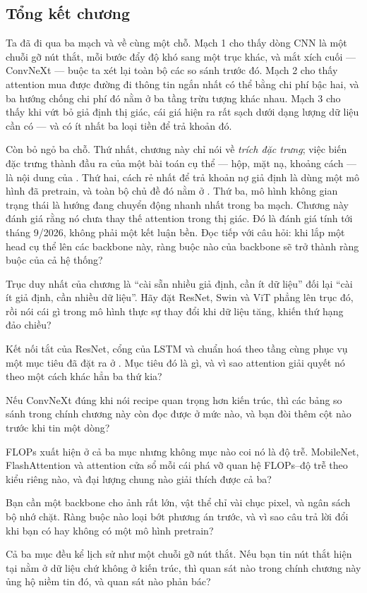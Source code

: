 \documentclass[../../deep_learning.tex]{subfiles}
\begin{document}
\subsection*{Tổng kết chương}
Ta đã đi qua ba mạch và về cùng một chỗ. Mạch 1 cho thấy dòng CNN là một chuỗi gỡ nút thắt, mỗi bước đẩy độ khó sang một trục khác, và mắt xích cuối --- ConvNeXt --- buộc ta xét lại toàn bộ các so sánh trước đó. Mạch 2 cho thấy attention mua được đường đi thông tin ngắn nhất có thể bằng chi phí bậc hai, và ba hướng chống chi phí đó nằm ở ba tầng trừu tượng khác nhau. Mạch 3 cho thấy khi vứt bỏ giả định thị giác, cái giá hiện ra rất sạch dưới dạng lượng dữ liệu cần có --- và có ít nhất ba loại tiền để trả khoản đó.

Còn bỏ ngỏ ba chỗ. Thứ nhất, chương này chỉ nói về \emph{trích đặc trưng}; việc biến đặc trưng thành đầu ra của một bài toán cụ thể --- hộp, mặt nạ, khoảng cách --- là nội dung của . Thứ hai, cách rẻ nhất để trả khoản nợ giả định là dùng một mô hình đã pretrain, và toàn bộ chủ đề đó nằm ở . Thứ ba, mô hình không gian trạng thái là hướng đang chuyển động nhanh nhất trong ba mạch. Chương này đánh giá rằng nó chưa thay thế attention trong thị giác. Đó là đánh giá tính tới tháng 9/2026, không phải một kết luận bền. Đọc tiếp  với câu hỏi: khi lắp một head cụ thể lên các backbone này, ràng buộc nào của backbone sẽ trở thành ràng buộc của cả hệ thống?
\begin{tukiem}
\item Trục duy nhất của chương là ``cài sẵn nhiều giả định, cần ít dữ liệu'' đối lại ``cài ít giả định, cần nhiều dữ liệu''. Hãy đặt ResNet, Swin và ViT phẳng lên trục đó, rồi nói cái gì trong mô hình thực sự thay đổi khi dữ liệu tăng, khiến thứ hạng đảo chiều?
\item Kết nối tắt của ResNet, cổng của LSTM và chuẩn hoá theo tầng cùng phục vụ một mục tiêu đã đặt ra ở . Mục tiêu đó là gì, và vì sao attention giải quyết nó theo một cách khác hẳn ba thứ kia?
\item Nếu ConvNeXt đúng khi nói recipe quan trọng hơn kiến trúc, thì các bảng so sánh trong chính chương này còn đọc được ở mức nào, và bạn đòi thêm cột nào trước khi tin một dòng?
\item FLOPs xuất hiện ở cả ba mục nhưng không mục nào coi nó là độ trễ. MobileNet, FlashAttention và attention cửa sổ mỗi cái phá vỡ quan hệ FLOPs--độ trễ theo kiểu riêng nào, và đại lượng chung nào giải thích được cả ba?
\item Bạn cần một backbone cho ảnh rất lớn, vật thể chỉ vài chục pixel, và ngân sách bộ nhớ chặt. Ràng buộc nào loại bớt phương án trước, và vì sao câu trả lời đổi khi bạn có hay không có một mô hình pretrain?
\item Cả ba mục đều kể lịch sử như một chuỗi gỡ nút thắt. Nếu bạn tin nút thắt hiện tại nằm ở dữ liệu chứ không ở kiến trúc, thì quan sát nào trong chính chương này ủng hộ niềm tin đó, và quan sát nào phản bác?
\end{tukiem}
\ifSubfilesClassLoaded{\printbibliography[title={Nguồn}]}{}
\end{document}
